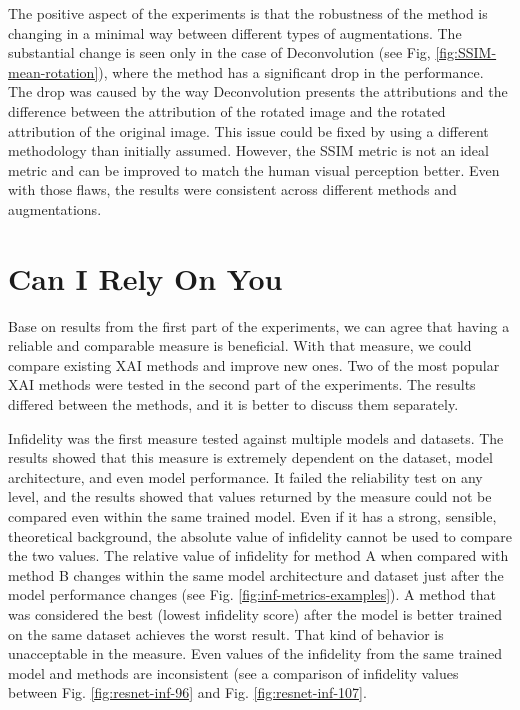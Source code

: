 \vspace{\baselineskip}

The positive aspect of the experiments is that the robustness of the method is changing in a minimal way between different types of augmentations. The substantial change is seen only in the case of Deconvolution (see Fig, \ref{fig:SSIM-mean-rotation}), where the method has a significant drop in the performance. The drop was caused by the way Deconvolution presents the attributions and the difference between the attribution of the rotated image and the rotated attribution of the original image. This issue could be fixed by using a different methodology than initially assumed. However, the SSIM metric is not an ideal metric and can be improved to match the human visual perception better. Even with those flaws, the results were consistent across different methods and augmentations.

\section{Can I Rely On You}

Base on results from the first part of the experiments, we can agree that having a reliable and comparable measure is beneficial. With that measure, we could compare existing XAI methods and improve new ones. Two of the most popular XAI methods were tested in the second part of the experiments. The results differed between the methods, and it is better to discuss them separately. 

\vspace{\baselineskip}

Infidelity was the first measure tested against multiple models and datasets. The results showed that this measure is extremely dependent on the dataset, model architecture, and even model performance. It failed the reliability test on any level, and the results showed that values returned by the measure could not be compared even within the same trained model. Even if it has a strong, sensible, theoretical background, the absolute value of infidelity cannot be used to compare the two values. The relative value of infidelity for method A when compared with method B changes within the same model architecture and dataset just after the model performance changes (see Fig. \ref{fig:inf-metrics-examples}). A method that was considered the best (lowest infidelity score) after the model is better trained on the same dataset achieves the worst result. That kind of behavior is unacceptable in the measure. Even values of the infidelity from the same trained model and methods are inconsistent (see a comparison of infidelity values between Fig. \ref{fig:resnet-inf-96} and Fig. \ref{fig:resnet-inf-107}.

